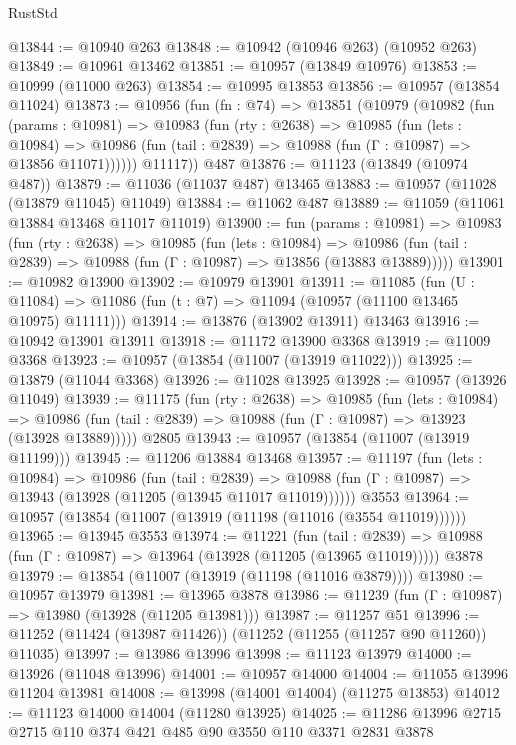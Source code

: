 \begin{lexlean}{RustStd}
\begin{coremodule}
{\begin{coremodule}
{{{{{{{{{{{{{{{{{{{{{{{{{{{{{{{{{@13844 := @10940 @263
@13848 := @10942 (@10946 @263) (@10952 @263)
@13849 := @10961 @13462
@13851 := @10957 (@13849 @10976)
@13853 := @10999 (@11000 @263)
@13854 := @10995 @13853
@13856 := @10957 (@13854 @11024)
@13873 := @10956
    (fun (fn : @74) =>
    @13851
      (@10979
        (@10982
          (fun (params : @10981) =>
          @10983
            (fun (rty : @2638) =>
            @10985
              (fun (lets : @10984) =>
              @10986 (fun (tail : @2839) => @10988 (fun (Γ : @10987) => @13856 @11071))))))
        @11117))
    @487
@13876 := @11123 (@13849 (@10974 @487))
@13879 := @11036 (@11037 @487) @13465
@13883 := @10957 (@11028 (@13879 @11045) @11049)
@13884 := @11062 @487
@13889 := @11059 (@11061 @13884 @13468 @11017 @11019)
@13900 := fun (params : @10981) =>
  @10983
    (fun (rty : @2638) =>
    @10985
      (fun (lets : @10984) =>
      @10986 (fun (tail : @2839) => @10988 (fun (Γ : @10987) => @13856 (@13883 @13889)))))
@13901 := @10982 @13900
@13902 := @10979 @13901
@13911 := @11085
    (fun (U : @11084) => @11086 (fun (t : @7) => @11094 (@10957 (@11100 @13465 @10975) @11111)))
@13914 := @13876 (@13902 @13911) @13463
@13916 := @10942 @13901 @13911
@13918 := @11172 @13900 @3368
@13919 := @11009 @3368
@13923 := @10957 (@13854 (@11007 (@13919 @11022)))
@13925 := @13879 (@11044 @3368)
@13926 := @11028 @13925
@13928 := @10957 (@13926 @11049)
@13939 := @11175
    (fun (rty : @2638) =>
    @10985
      (fun (lets : @10984) =>
      @10986 (fun (tail : @2839) => @10988 (fun (Γ : @10987) => @13923 (@13928 @13889)))))
    @2805
@13943 := @10957 (@13854 (@11007 (@13919 @11199)))
@13945 := @11206 @13884 @13468
@13957 := @11197
    (fun (lets : @10984) =>
    @10986
      (fun (tail : @2839) =>
      @10988 (fun (Γ : @10987) => @13943 (@13928 (@11205 (@13945 @11017 @11019))))))
    @3553
@13964 := @10957 (@13854 (@11007 (@13919 (@11198 (@11016 (@3554 @11019))))))
@13965 := @13945 @3553
@13974 := @11221
    (fun (tail : @2839) => @10988 (fun (Γ : @10987) => @13964 (@13928 (@11205 (@13965 @11019)))))
    @3878
@13979 := @13854 (@11007 (@13919 (@11198 (@11016 @3879))))
@13980 := @10957 @13979
@13981 := @13965 @3878
@13986 := @11239 (fun (Γ : @10987) => @13980 (@13928 (@11205 @13981)))
@13987 := @11257 @51
@13996 := @11252 (@11424 (@13987 @11426)) (@11252 (@11255 (@11257 @90 @11260)) @11035)
@13997 := @13986 @13996
@13998 := @11123 @13979
@14000 := @13926 (@11048 @13996)
@14001 := @10957 @14000
@14004 := @11055 @13996 @11204 @13981
@14008 := @13998 (@14001 @14004) (@11275 @13853)
@14012 := @11123 @14000 @14004 (@11280 @13925)
@14025 := @11286 @13996 @2715 @2715 @110 @374 @421 @485 @90 @3550 @110 @3371 @2831 @3878
}}}}}}}}}}}}}}}}}}}}}}}}}}}}}}}}}
\end{coremodule}}
\end{coremodule}
\end{lexlean}
